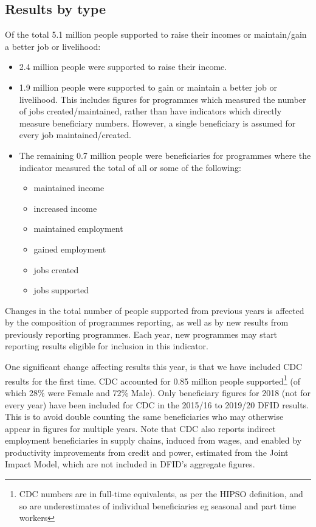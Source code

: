 \subsection{Results by type}
Of the total 5.1 million people supported to raise their incomes or maintain/gain a better job or livelihood:

\begin{itemize}
\item 2.4 million people were supported to raise their income.
\item 1.9 million people were supported to gain or maintain a better job or livelihood. %
This includes figures for programmes which measured the number of jobs created/maintained, rather than have indicators which directly measure beneficiary numbers. %
However, a single beneficiary is assumed for every job maintained/created. %
\item The remaining 0.7 million people were beneficiaries for programmes where the indicator measured the total of all or some of the following:
	\begin{itemize}
		\item maintained income
		\item increased income
		\item maintained employment
		\item gained employment
		\item jobs created
		\item jobs supported
	\end{itemize}
\end{itemize}

Changes in the total number of people supported from previous years is affected by the composition of programmes reporting, as well as by new results from previously reporting programmes. %
Each year, new programmes may start reporting results eligible for inclusion in this indicator.  %

One significant change affecting results this year, is that we have included CDC results for the first time. %
CDC accounted for 0.85 million people supported\footnote{CDC numbers are in full-time equivalents, as per the HIPSO definition, and so are underestimates of individual beneficiaries eg seasonal and part time workers} (of which 28\% were Female and 72\% Male). %
Only beneficiary figures for 2018 (not for every year) have been included for CDC in the 2015/16 to 2019/20 DFID results. %
This is to avoid double counting the same beneficiaries who may otherwise appear in figures for multiple years. %
Note that CDC also reports indirect employment beneficiaries in supply chains, induced from wages, and enabled by productivity improvements from credit and power, estimated from the Joint Impact Model, which are not included in DFID’s aggregate figures.%


